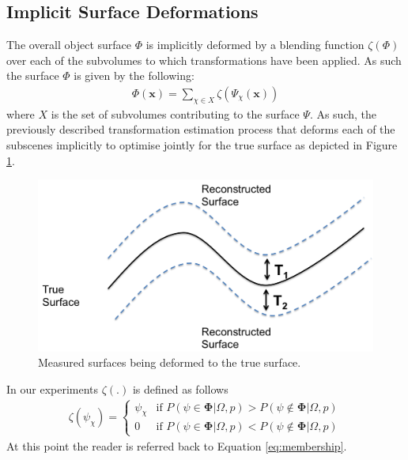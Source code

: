 \subsection{Implicit Surface Deformations}
The overall object surface $\Phi$ is implicitly deformed by a blending function $\zeta(\Phi)$ over each of the subvolumes to which transformations have been applied.
As such the surface $\Phi$ is given by the following:
\begin{equation}
\begin{split}
\Phi(\mathbf{x}) = \sum_{\chi \in X} \zeta(\Psi_{\chi}(\mathbf{x}))
\end{split}
\end{equation}
where $X$ is the set of subvolumes contributing to the surface $\Psi$. As such, the previously described transformation estimation process that deforms each of the subscenes implicitly to optimise jointly 
for the true surface as depicted in Figure \ref{fig:deformationDiagram}.
\begin{figure}[!t]
	\centering
	\includegraphics[scale=0.25]{deformation.png}
	\vspace{-3mm}
	\caption{Measured surfaces being deformed to the true surface.}
	\label{fig:deformationDiagram}
\end{figure}
In our experiments $\zeta (.)$ is defined as follows
\begin{equation}
\begin{split}
\zeta(\psi_{\chi}) = 
\begin{cases}
\psi_{\chi} & \text{if $P(\psi \in \mathbf{\Phi} | \Omega, p) > P(\psi \notin \mathbf{\Phi} | \Omega, p)$} \\
0 & \text{if $P(\psi \in \mathbf{\Phi} | \Omega, p) < P(\psi \notin \mathbf{\Phi} | \Omega, p)$}
\end{cases}
\end{split}
\end{equation}
At this point the reader is referred back to Equation \ref{eq:membership}.

